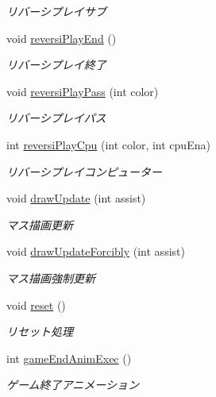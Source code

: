 \begin{DoxyCompactItemize}
\begin{DoxyCompactList}\small\item\em リバーシプレイサブ \end{DoxyCompactList}\item 
void \hyperlink{class_reversi_form_1_1_reversi_play_abb6d68c910c7d14ff4eaa8db745f0449}{reversi\+Play\+End} ()
\begin{DoxyCompactList}\small\item\em リバーシプレイ終了 \end{DoxyCompactList}\item 
void \hyperlink{class_reversi_form_1_1_reversi_play_adcbe040514044b7cc8498c0764638356}{reversi\+Play\+Pass} (int color)
\begin{DoxyCompactList}\small\item\em リバーシプレイパス \end{DoxyCompactList}\item 
int \hyperlink{class_reversi_form_1_1_reversi_play_abec0ea86adfc0d2f960af71235eea016}{reversi\+Play\+Cpu} (int color, int cpu\+Ena)
\begin{DoxyCompactList}\small\item\em リバーシプレイコンピューター \end{DoxyCompactList}\item 
void \hyperlink{class_reversi_form_1_1_reversi_play_af1415f15759ba8475b4b5afca3a35017}{draw\+Update} (int assist)
\begin{DoxyCompactList}\small\item\em マス描画更新 \end{DoxyCompactList}\item 
void \hyperlink{class_reversi_form_1_1_reversi_play_accc1d553ba6a6c2a5f0c58316b40a183}{draw\+Update\+Forcibly} (int assist)
\begin{DoxyCompactList}\small\item\em マス描画強制更新 \end{DoxyCompactList}\item 
void \hyperlink{class_reversi_form_1_1_reversi_play_a03997d634aa21a84e660e7f98aa27064}{reset} ()
\begin{DoxyCompactList}\small\item\em リセット処理 \end{DoxyCompactList}\item 
int \hyperlink{class_reversi_form_1_1_reversi_play_aec95b109a53b3cdab6466a4fca52f967}{game\+End\+Anim\+Exec} ()
\begin{DoxyCompactList}\small\item\em ゲーム終了アニメーション \end{DoxyCompactList}\item 

\end{DoxyCompactItemize}
